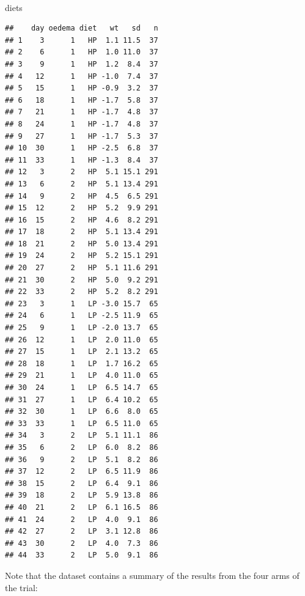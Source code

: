 \documentclass[12pt,a4paper]{book}
\newenvironment{Shaded}{\begin{snugshade}}{\end{snugshade}}
\newcommand{\NormalTok}[1]{#1}
\theoremstyle{definition}
\theoremstyle{definition}
\theoremstyle{definition}
\theoremstyle{remark}
\begin{document}
~

\begin{Shaded}
\begin{Highlighting}[]
\NormalTok{diets}
\end{Highlighting}
\end{Shaded}

\begin{verbatim}
##    day oedema diet   wt   sd   n
## 1    3      1   HP  1.1 11.5  37
## 2    6      1   HP  1.0 11.0  37
## 3    9      1   HP  1.2  8.4  37
## 4   12      1   HP -1.0  7.4  37
## 5   15      1   HP -0.9  3.2  37
## 6   18      1   HP -1.7  5.8  37
## 7   21      1   HP -1.7  4.8  37
## 8   24      1   HP -1.7  4.8  37
## 9   27      1   HP -1.7  5.3  37
## 10  30      1   HP -2.5  6.8  37
## 11  33      1   HP -1.3  8.4  37
## 12   3      2   HP  5.1 15.1 291
## 13   6      2   HP  5.1 13.4 291
## 14   9      2   HP  4.5  6.5 291
## 15  12      2   HP  5.2  9.9 291
## 16  15      2   HP  4.6  8.2 291
## 17  18      2   HP  5.1 13.4 291
## 18  21      2   HP  5.0 13.4 291
## 19  24      2   HP  5.2 15.1 291
## 20  27      2   HP  5.1 11.6 291
## 21  30      2   HP  5.0  9.2 291
## 22  33      2   HP  5.2  8.2 291
## 23   3      1   LP -3.0 15.7  65
## 24   6      1   LP -2.5 11.9  65
## 25   9      1   LP -2.0 13.7  65
## 26  12      1   LP  2.0 11.0  65
## 27  15      1   LP  2.1 13.2  65
## 28  18      1   LP  1.7 16.2  65
## 29  21      1   LP  4.0 11.0  65
## 30  24      1   LP  6.5 14.7  65
## 31  27      1   LP  6.4 10.2  65
## 32  30      1   LP  6.6  8.0  65
## 33  33      1   LP  6.5 11.0  65
## 34   3      2   LP  5.1 11.1  86
## 35   6      2   LP  6.0  8.2  86
## 36   9      2   LP  5.1  8.2  86
## 37  12      2   LP  6.5 11.9  86
## 38  15      2   LP  6.4  9.1  86
## 39  18      2   LP  5.9 13.8  86
## 40  21      2   LP  6.1 16.5  86
## 41  24      2   LP  4.0  9.1  86
## 42  27      2   LP  3.1 12.8  86
## 43  30      2   LP  4.0  7.3  86
## 44  33      2   LP  5.0  9.1  86
\end{verbatim}

\newpage

Note that the dataset contains a summary of the results from the four
arms of the trial:

~
\end{document}
